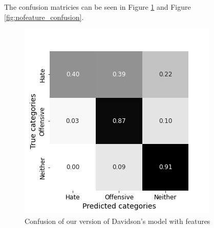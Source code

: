 \documentclass[11pt,a4paper]{article}
\begin{document}
\begin{table}
\caption{classification report for our reproduction of Davidson's model without features} 



\label{tab:davidson_nofeat}
\end{table}

The confusion matricies can be seen in Figure \ref{fig:feature_confusion} and  Figure \ref{fig:nofeature_confusion}.

\begin{figure}[h]
  \includegraphics[width=\linewidth]{./tables-figures/feat_confusion.jpg}
  \caption{Confusion of our version of Davidson's model with features}
  \label{fig:feature_confusion}
\end{figure}
\end{document}
